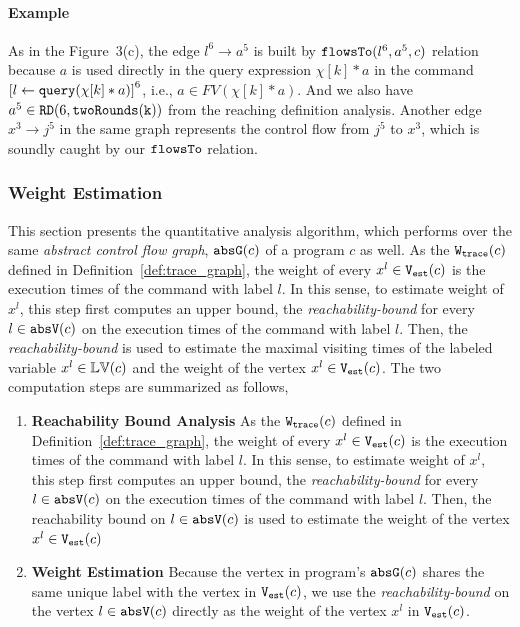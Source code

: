   \paragraph*{Example}
As in the Figure~3(c), 
the edge $l^6 \to a^5$ is built by $\mathtt{flowsTo}(l^6, a^5, c)$ relation because
$a$ is used directly in the query expression $\chi[k]*a$
in the command $\clabel{\assign{l}{\query(\chi[k]*a)}}^6$,
i.e., $a \in FV(\chi[k]*a)$.
And we also have $a^5 \in \mathtt{RD}(6, \mathtt{twoRounds(k)})$ from the reaching definition analysis.
Another edge $x^3 \to j^5$ in the same graph represents the control flow from $j^5$ to $x^3$, which is soundly caught by our $\mathtt{flowsTo}$ relation.
%

\subsubsection{Weight Estimation}
\label{sec:alg_weightgen}
%
This section presents the quantitative analysis algorithm, which performs over the same \emph{abstract control flow graph}, $\mathtt{abs}{\mathtt{G}}(c)$ of a program $c$ as well. 
As the $\mathtt{{W_{trace}}}(c)$ defined in Definition~\ref{def:trace_graph}, the weight of every $x^l \in \mathtt{{V_{est}}}(c)$ is
the execution times of the command with label $l$. 
In this sense, to estimate weight of $x^l$, this step first computes an upper bound, the \emph{reachability-bound}\cite{GulwaniZ10} for every $l \in \mathtt{abs}{\mathtt{V}}(c)$
on the execution times of the command with label $l$. 
Then,
the \emph{reachability-bound} is used to estimate the maximal visiting times of the labeled variable $x^l \in \mathbb{LV}(c)$
and 
the weight of the vertex $x^l \in \mathtt{{V_{est}}}(c)$.
The two computation steps are summarized as follows,
\begin{enumerate}
  \item \textbf{Reachability Bound Analysis}
  As the $\mathtt{{W_{trace}}}(c)$ defined in Definition~\ref{def:trace_graph}, the weight of every $x^l \in \mathtt{{V_{est}}}(c)$ is
  the execution times of the command with label $l$. 
In this sense, to estimate weight of $x^l$, this step first computes an upper bound, the \emph{reachability-bound} for every $l \in \mathtt{abs}{\mathtt{V}}(c)$
on the execution times of the command with label $l$. 
Then,
the reachability bound on $l \in \mathtt{abs}{\mathtt{V}}(c)$ is used to estimate the weight of the vertex $x^l \in \mathtt{{V_{est}}}(c) $

    \item \textbf{Weight Estimation}
    Because
    the vertex in program's $\mathtt{abs}{\mathtt{G}}(c)$ shares the same unique label with the vertex in $\mathtt{{V_{est}}}(c)$, 
    we use the \emph{reachability-bound} on the vertex $l \in \mathtt{abs}{\mathtt{V}}(c)$ directly as the weight of the vertex $x^l$ in $\mathtt{{V_{est}}}(c)$.
\end{enumerate}

